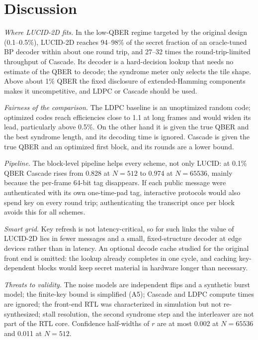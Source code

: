\documentclass[conference]{IEEEtran}
\begin{document}
\section{Discussion}\label{sec:discussion}
\textit{Where LUCID-2D fits.} In the low-QBER regime targeted by the original design (0.1--0.5\%), LUCID-2D reaches 94--98\% of the secret fraction of an oracle-tuned BP decoder within about one round trip, and 27--32 times the round-trip-limited throughput of Cascade. Its decoder is a hard-decision lookup that needs no estimate of the QBER to decode; the syndrome meter only selects the tile shape. Above about 1\% QBER the fixed disclosure of extended-Hamming components makes it uncompetitive, and LDPC or Cascade should be used.

\textit{Fairness of the comparison.} The LDPC baseline is an unoptimized random code; optimized codes reach efficiencies close to 1.1 at long frames \cite{elkouss2009,elkouss2011,mao2019} and would widen its lead, particularly above 0.5\%. On the other hand it is given the true QBER and the best syndrome length, and its decoding time is ignored. Cascade is given the true QBER and an optimized first block, and its rounds are a lower bound.

\textit{Pipeline.} The block-level pipeline helps every scheme, not only LUCID: at 0.1\% QBER Cascade rises from 0.828 at $N=512$ to 0.974 at $N=65536$, mainly because the per-frame 64-bit tag disappears. If each public message were authenticated with its own one-time-pad tag, interactive protocols would also spend key on every round trip; authenticating the transcript once per block avoids this for all schemes.

\textit{Smart grid.} Key refresh is not latency-critical, so for such links the value of LUCID-2D lies in fewer messages and a small, fixed-structure decoder at edge devices rather than in latency. An optional decode cache studied for the original front end is omitted: the lookup already completes in one cycle, and caching key-dependent blocks would keep secret material in hardware longer than necessary.

\textit{Threats to validity.} The noise models are independent flips and a synthetic burst model; the finite-key bound is simplified (A5); Cascade and LDPC compute times are ignored; the front-end RTL was characterized in simulation but not re-synthesized; stall resolution, the second syndrome step and the interleaver are not part of the RTL core. Confidence half-widths of $r$ are at most 0.002 at $N=65536$ and 0.011 at $N=512$.
\end{document}
